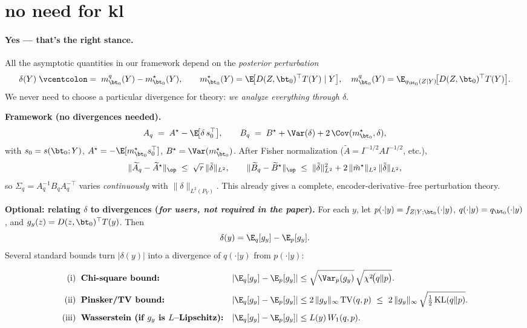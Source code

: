 \section{no need for kl}
\paragraph{Yes — that’s the right stance.}
All the asymptotic quantities in our framework depend on the \emph{posterior perturbation}
\[
\delta(Y)\;\vcentcolon=\;m_{\bt_0}^q(Y)-m_{\bt_0}^\star(Y),\qquad
m_{\bt_0}^\star(Y)=\E\!\big[D(Z,\bt_0)^\top T(Y)\mid Y\big],
\quad
m_{\bt_0}^q(Y)=\E_{q_{\bt_0}(Z\mid Y)}\!\big[D(Z,\bt_0)^\top T(Y)\big].
\]
We never need to choose a particular divergence for theory: \emph{we analyze everything through \(\delta\)}.

\medskip
\noindent\textbf{Framework (no divergences needed).}
\[
A_q \;=\; A^\star - \E\!\big[\delta\,s_0^\top\big],\qquad
B_q \;=\; B^\star + \Var(\delta)+2\,\Cov(m_{\bt_0}^\star,\delta),
\]
with \(s_0=s(\bt_0;Y)\), \(A^\star=-\E[m_{\bt_0}^\star s_0^\top]\), \(B^\star=\Var(m_{\bt_0}^\star)\).
After Fisher normalization (\(\widetilde A=I^{-1/2}AI^{-1/2}\), etc.),
\[
\|\widetilde A_q-\widetilde A^\star\|_{\op}\;\le\; \sqrt{r}\,\|\tilde\delta\|_{L^2},\qquad
\|\widetilde B_q-\widetilde B^\star\|_{\op}\;\le\; \|\tilde\delta\|_{L^2}^2 + 2\,\|\tilde m^\star\|_{L^2}\,\|\tilde\delta\|_{L^2},
\]
so \(\Sigma_q=A_q^{-1}B_qA_q^{-\top}\) varies \emph{continuously} with \(\|\delta\|_{L^2(P_Y)}\).  
This already gives a complete, encoder-derivative–free perturbation theory.

\medskip
\noindent\textbf{Optional: relating \(\delta\) to divergences (\emph{for users, not required in the paper}).}
For each \(y\), let \(p(\cdot|y)=f_{Z\mid Y;\bt_0}(\cdot|y)\), \(q(\cdot|y)=q_{\bt_0}(\cdot|y)\), and
\(g_y(z)=D(z,\bt_0)^\top T(y)\). Then
\[
\delta(y)=\E_q[g_y]-\E_p[g_y].
\]
Several standard bounds turn \(|\delta(y)|\) into a divergence of \(q(\cdot|y)\) from \(p(\cdot|y)\):

\begin{align*}
\text{(i) }\;&\textbf{Chi-square bound:}&
|\E_q[g_y]-\E_p[g_y]|
&\le \sqrt{\Var_p(g_y)}\,\sqrt{\chi^2\!\big(q\|p\big)}.\\[3pt]
\text{(ii) }\;&\textbf{Pinsker/TV bound:}&
|\E_q[g_y]-\E_p[g_y]|
&\le 2\,\|g_y\|_\infty\,\mathrm{TV}(q,p)
\ \le\ 2\,\|g_y\|_\infty\,\sqrt{\tfrac12\,\mathrm{KL}(q\|p)}.\\[3pt]
\text{(iii) }\;&\textbf{Wasserstein (if $g_y$ is $L$–Lipschitz):}&
|\E_q[g_y]-\E_p[g_y]|
&\le L(y)\,W_1(q,p).
\end{align*}

